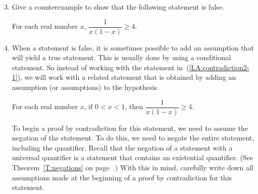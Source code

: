 \begin{previewactivity}
\begin{enumerate} \setcounter{enumi}{2}
\item Give a counterexample to show that the following statement is false.
\label{LA:contradiction2-1}%
  \begin{center}
   For each real number  $x$, $\dfrac{1}{x(1 - x)} \geq 4$.
  \end{center}
\item When a statement is false, it is sometimes possible to add an assumption that will yield a true statement. This is usually done by using a conditional statement.  So instead of working with the statement in~(\ref{LA:contradiction2-1}), we will work with a related statement that is obtained by adding an assumption (or assumptions) to the hypothesis.
  \begin{center}
   For each real number  $x$, if $0 < x < 1$, then $\dfrac{1}{x(1 - x)} \geq 4$.
  \end{center}
To begin a proof by contradiction for this statement, we need to assume the negation of the statement.  To do this, we need to negate the entire statement, including the quantifier.  Recall that the negation of a statement with a universal quantifier is a statement that contains an existential quantifier.  (See Theorem~\ref{T:negations} on page~\pageref{T:negations}.)  With this in mind, carefully write down all assumptions made at the beginning of a proof by contradiction for this statement.
\end{enumerate}
%



\end{previewactivity}
\hbreak
%
\endinput
